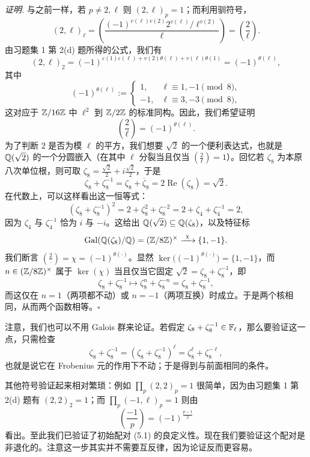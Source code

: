 \textit{证明.} 与之前一样，若 $p\neq 2,\ell$ 则 $(2,\ell)_p=1$；而利用驯符号，
\[
(2,\ell)_\ell=\left(\frac{(-1)^{v(\ell)v(2)}2^{v(\ell)}/\ell^{v(2)}}{\ell}\right)
=\left(\frac{2}{\ell}\right).
\]
由习题集 1 第 2(d) 题所得的公式，我们有
\[
(2,\ell)_2=(-1)^{\varepsilon(1)\varepsilon(\ell)+v(2)\theta(\ell)+v(\ell)\theta(1)}=(-1)^{\theta(\ell)},
\]
其中
\[
(-1)^{\theta(\ell)}:=
\begin{cases}
1, & \ell\equiv 1,-1\pmod 8,\\
-1, & \ell\equiv 3,-3\pmod 8,
\end{cases}
\]
这对应于 $\mathbb{Z}/16\mathbb{Z}$ 中 $\ell^2$ 到 $\mathbb{Z}/2\mathbb{Z}$ 的标准同构。因此，我们希望证明
\[
\left(\frac{2}{\ell}\right)=(-1)^{\theta(\ell)}.
\]
为了判断 $2$ 是否为模 $\ell$ 的平方，我们想要 $\sqrt2$ 的一个便利表达式，也就是 $\mathbb{Q}(\sqrt2)$ 的一个分圆嵌入（在其中 $\ell$ 分裂当且仅当 $\left(\frac{2}{\ell}\right)=1$）。回忆若 $\zeta_8$ 为本原八次单位根，则可取 $\zeta_8=\frac{\sqrt2}{2}+i\frac{\sqrt2}{2}$，于是
\[
\zeta_8+\zeta_8^{-1}=\zeta_8+\overline{\zeta}_8=2\operatorname{Re}(\zeta_8)=\sqrt2.
\]
在代数上，可以这样看出这一恒等式：
\[
(\zeta_8+\zeta_8^{-1})^2=2+\zeta_8^2+\zeta_8^{-2}=2+\zeta_4+\zeta_4^{-1}=2,
\]
因为 $\zeta_4$ 与 $\zeta_4^{-1}$ 恰为 $i$ 与 $-i$。这给出 $\mathbb{Q}(\sqrt2)\subseteq\mathbb{Q}(\zeta_8)$，以及特征标
\[
\Gal(\Q(\zeta_8)/\Q)=(\Z/8\Z)^\times\xrightarrow{\ \chi\ }\{1,-1\}.
\]
我们断言 $\left(\frac{2}{\cdot}\right)=\chi=(-1)^{\theta(\cdot)}$。显然 $\ker\bigl((-1)^{\theta(\cdot)}\bigr)=\{1,-1\}$，而 $n\in(\mathbb{Z}/8\mathbb{Z})^\times$ 属于 $\ker(\chi)$ 当且仅当它固定 $\sqrt2=\zeta_8+\zeta_8^{-1}$，即
\[
\zeta_8+\zeta_8^{-1}\longmapsto\zeta_8^n+\zeta_8^{-n}=\zeta_8+\zeta_8^{-1},
\]
而这仅在 $n=1$（两项都不动）或 $n=-1$（两项互换）时成立。于是两个核相同，从而两个函数相等。\hfill$\square$

注意，我们也可以不用 Galois 群来论证。若假定 $\zeta_8+\zeta_8^{-1}\in\mathbb{F}_\ell$，那么要验证这一点，只需检查
\[
\zeta_8+\zeta_8^{-1}=(\zeta_8+\zeta_8^{-1})^\ell=\zeta_8^\ell+\zeta_8^{-\ell},
\]
也就是说它在 Frobenius 元的作用下不动；于是得到与前面相同的条件。

其他符号验证起来相对繁琐：例如 $\prod_p(2,2)_p=1$ 很简单，因为由习题集 1 第 2(d) 题有 $(2,2)_2=1$；而 $\prod_p(-1,\ell)_p=1$ 则由
\[
\left(\frac{-1}{p}\right)=(-1)^{\frac{p-1}{2}}
\]
看出。至此我们已验证了初始配对 (5.1) 的良定义性。现在我们要验证这个配对是非退化的。注意这一步其实并不需要互反律，因为论证反而更容易。

